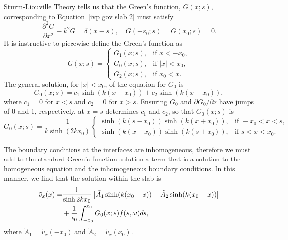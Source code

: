\documentclass[12pt]{../style-files/ociamthesis}
\begin{document}
Sturm-Liouville Theory tells us that the Green's function, $G(x;s)$, corresponding to Equation~\eqref{ivp gov slab 2} must satisfy 
\begin{equation}
\frac{\partial^2G}{\partial x^2} - k^2 G = \delta(x - s), \quad G(-x_0; s) = G(x_0; s) = 0.
\end{equation}
It is instructive to piecewise define the Green's function as
\begin{equation}
G(x; s) = 
\begin{cases}
G_1(x; s), & \text{if } x < -x_0, \\
G_0(x; s), & \text{if } |x| < x_0, \\
G_2(x; s), & \text{if } x_0 < x.
\end{cases}
\end{equation}
The general solution, for $|x| < x_0$, of the equation for $G_0$ is
\begin{equation}
G_0(x; s) = c_1\sinh(k(x - x_0)) + c_2\sinh(k(x + x_0)),
\end{equation}
where $c_1 = 0$ for $x < s$ and $c_2 = 0$ for $x > s$. Ensuring $G_0$ and $\partial G_0 / \partial x$ have jumps of 0 and 1, respectively, at $x = s$  determines $c_1$ and $c_2$, so that $G_0(x;s)$ is
\begin{equation}
G_0(x;s) = \frac{1}{k\sinh(2k x_0)}
\begin{cases}
\sinh(k(s - x_0))\sinh(k(x + x_0)), & \text{if } -x_0<x<s, \\
\sinh(k(x - x_0))\sinh(k(s + x_0)), & \text{if } s<x<x_0.
\end{cases}
\end{equation}

The boundary conditions at the interfaces are inhomogeneous, therefore we must add to the standard Green's function solution a term that is a solution to the homogeneous equation and the inhomogeneous boundary conditions. In this manner, we find that the solution within the slab is
\begin{align}
\tilde{v}_x(x) = &\frac{1}{\sinh{2kx_0}} \left[ \tilde{A}_1\sinh(k(x_0 - x)) + \tilde{A}_2\sinh(k(x_0 + x)) \right] \notag \\
&+ \frac{1}{\epsilon_0}\int_{-x_0}^{x_0} G_0(x;s) f(s, \omega) ds,
\label{sol 0}
\end{align}
where $\tilde{A}_1 = \tilde{v}_x(-x_0)$ and $\tilde{A}_2 = \tilde{v}_x(x_0)$.
\end{document}

